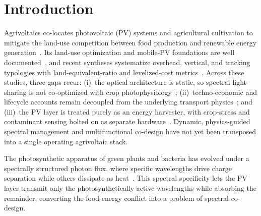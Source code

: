 \documentclass[preprint,12pt]{elsarticle}
\begin{document}


\section{Introduction}

Agrivoltaics co-locates photovoltaic (PV) systems and agricultural cultivation to mitigate the land-use competition between food production and renewable energy generation~\cite{Dupraz2011}. Its land-use optimization and mobile-PV foundations are well documented~\cite{Valle2017,Amaducci2018}, and recent syntheses systematize overhead, vertical, and tracking typologies with land-equivalent-ratio and levelized-cost metrics~\cite{Mahim2025}.
Across these studies, three gaps recur: (i)~the optical architecture is static, so spectral light-sharing is not co-optimized with crop photophysiology~\cite{Thompson2020,Zhao2023}; (ii)~techno-economic and lifecycle accounts remain decoupled from the underlying transport physics~\cite{Ravilla2024,Bellone2024}; and (iii)~the PV layer is treated purely as an energy harvester, with crop-stress and contaminant sensing bolted on as separate hardware~\cite{CiallaMay2024,Pook2025,KaurJeet2026}. Dynamic, physics-guided spectral management and multifunctional co-design have not yet been transposed into a single operating agrivoltaic stack.

The photosynthetic apparatus of green plants and bacteria has evolved under a spectrally structured photon flux, where specific wavelengths drive charge separation while others dissipate as heat~\cite{Blankenship2011}.
This spectral specificity lets the PV layer transmit only the photosynthetically active wavelengths while absorbing the remainder, converting the food-energy conflict into a problem of spectral co-design.
\end{document}
